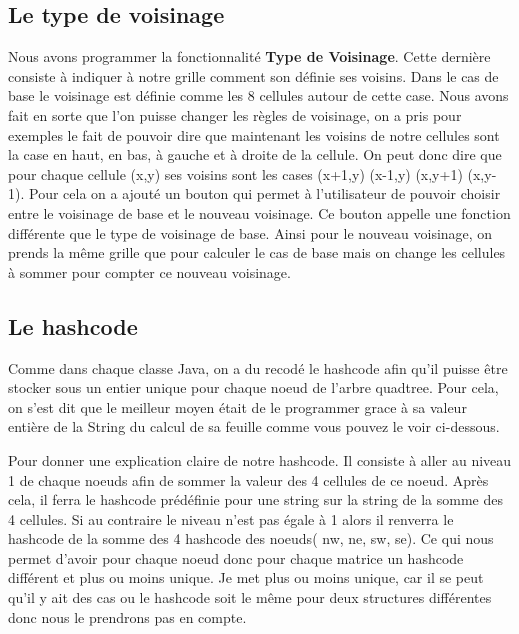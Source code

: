 \documentclass{article}
\begin{document}
\subsection{Le type de voisinage}
Nous avons programmer la fonctionnalité \textbf{Type de Voisinage}. Cette dernière consiste à indiquer à notre grille comment son définie ses voisins. Dans le cas de base le voisinage est définie comme les 8 cellules autour de cette case. Nous avons fait en sorte que l'on puisse changer les règles de voisinage, on a pris pour exemples le fait de pouvoir dire que maintenant les voisins de notre cellules sont la case en haut, en bas, à gauche et à droite de la cellule. On peut donc dire que pour chaque cellule (x,y) ses voisins sont les cases (x+1,y) (x-1,y) (x,y+1) (x,y-1). Pour cela on a ajouté un bouton qui permet à l'utilisateur de pouvoir choisir entre le voisinage de base et le nouveau voisinage. Ce bouton appelle une fonction différente que le type de voisinage de base. Ainsi pour le nouveau voisinage, on prends la même grille que pour calculer le cas de base mais on change les cellules à sommer pour compter ce nouveau voisinage. 

\subsection{Le hashcode}
Comme dans chaque classe Java, on a du recodé le hashcode afin qu'il puisse 
être stocker sous un entier unique pour chaque noeud de l'arbre quadtree. Pour cela, on s'est dit que le meilleur moyen était de le programmer grace à sa valeur entière de la String du calcul de sa feuille comme vous pouvez le voir ci-dessous.

\begin{algorithm}
    \DontPrintSemicolon
\caption {Algorithme du hashcode de nos noeud.}     
\end{algorithm}
Pour donner une explication claire de notre hashcode. Il consiste à aller au niveau 1 de chaque noeuds afin de sommer la valeur des 4 cellules de ce noeud. Après cela, il ferra le hashcode prédéfinie pour une string sur la string de la somme des 4 cellules. Si au contraire le niveau n'est pas égale à 1 alors il renverra le hashcode de la somme des 4 hashcode des noeuds( nw, ne, sw, se). Ce qui nous permet d'avoir pour chaque noeud donc pour chaque matrice un hashcode différent et plus ou moins unique. Je met plus ou moins unique, car il se peut qu'il y ait des cas ou le hashcode soit le même pour deux structures différentes donc nous le prendrons pas en compte. 
\end{document}
